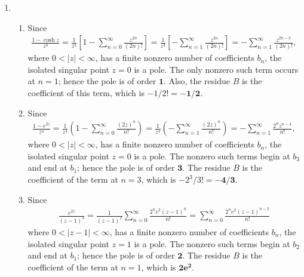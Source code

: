 \documentclass[a4paper,12pt]{article}
\begin{document}
\begin{enumerate}
    \item
        \begin{enumerate}
            \item
                Since
                \begin{align*}
                    \frac{1 - \cosh z}{z^3} = \frac{1}{z^3} \left[ 1 - \sum_{n = 0}^\infty \frac{z^{2n}}{(2n)!} \right] = \frac{1}{z^3} \left[ -\sum_{n = 1}^\infty \frac{z^{2n}}{(2n)!} \right] = -\sum_{n = 1}^\infty \frac{z^{2n - 3}}{(2n)!},
                \end{align*}
                where $0 < |z| < \infty$, has a finite nonzero number of coefficients $b_n$, the isolated singular point $z = 0$ is a pole. The only nonzero such term occurs at $n = 1$; hence the pole is of order $\mathbf{1}$. Also, the residue $B$ is the coefficient of this term, which is $-1/2! = \mathbf{-1/2}$.

            \item
                Since
                \begin{align*}
                    \frac{1 - e^{2z}}{z^4} = \frac{1}{z^4} \left( 1 - \sum_{n = 0}^\infty \frac{(2z)^n}{n!} \right) = \frac{1}{z^4} \left( -\sum_{n = 1}^\infty \frac{(2z)^n}{n!} \right) = -\sum_{n = 1}^\infty \frac{2^n z^{n - 4}}{n!},
                \end{align*}
                where $0 < |z| < \infty$, has a finite nonzero number of coefficients $b_n$, the isolated singular point $z = 0$ is a pole. The nonzero such terms begin at $b_3$ and end at $b_1$; hence the pole is of order $\mathbf{3}$. The residue $B$ is the coefficient of the term at $n = 3$, which is $-2^3/3! = \mathbf{-4/3}$.

            \item
                Since
                \begin{align*}
                    \frac{e^{2z}}{(z - 1)^2} = \frac{1}{(z - 1)^2} \sum_{n = 0}^\infty \frac{2^n e^2 (z - 1)^n}{n!} = \sum_{n = 0}^\infty \frac{2^n e^2 (z - 1)^{n - 2}}{n!}
                \end{align*}
                where $0 < |z - 1| < \infty$, has a finite nonzero number of coefficients $b_n$, the isolated singular point $z = 1$ is a pole. The nonzero such terms begin at $b_2$ and end at $b_1$; hence the pole is of order $\mathbf{2}$. The residue $B$ is the coefficient of the term at $n = 1$, which is $\mathbf{2e^2}$.
        \end{enumerate}


\end{enumerate}
\end{document}
